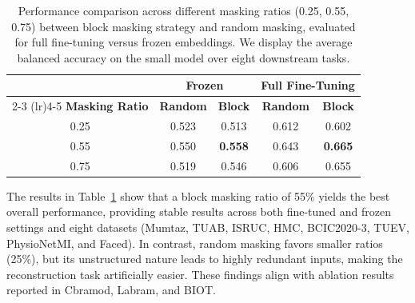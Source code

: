 \documentclass{article}
\begin{document}
\begin{table}[ht]
\centering
\caption{Performance comparison across different masking ratios (0.25, 0.55, 0.75) between block masking strategy and random masking, evaluated for full fine-tuning versus frozen embeddings. We display the average balanced accuracy on the small model over eight downstream tasks.}

\label{tab:rmask_results}
\begin{tabular}{ccccc}
\toprule
 & \multicolumn{2}{c}{\textbf{Frozen}} & \multicolumn{2}{c}{\textbf{Full Fine-Tuning}} \\ 
\cmidrule(lr){2-3} \cmidrule(lr){4-5}
 \textbf{Masking Ratio}                      & \textbf{Random}        & \textbf{Block}      & \textbf{Random}        & \textbf{Block}      \\ 
\midrule
        0.25 & 0.523 & 0.513 & 0.612 & 0.602 \\
        0.55 & 0.550 & \textbf{0.558} & 0.643 & \textbf{0.665} \\
        0.75 & 0.519 & 0.546 & 0.606 & 0.655 \\
\bottomrule
\end{tabular}
\end{table}

The results in Table~\ref{tab:rmask_results} show that a block masking ratio of 55\% yields the best overall performance, providing stable results across both fine-tuned and frozen settings and eight datasets (Mumtaz, TUAB, ISRUC, HMC, BCIC2020-3, TUEV, PhysioNetMI, and Faced). In contrast, random masking favors smaller ratios (25\%), but its unstructured nature leads to highly redundant inputs, making the reconstruction task artificially easier.
These findings align with ablation results reported in Cbramod, Labram, and BIOT.
\end{document}
